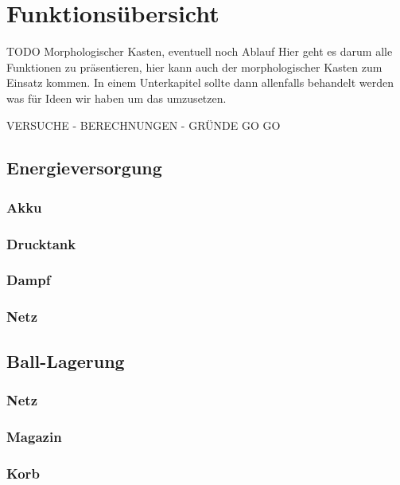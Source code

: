 \section{Funktionsübersicht}
TODO Morphologischer Kasten, eventuell noch Ablauf Hier geht es darum alle Funktionen zu präsentieren, hier kann auch der morphologischer Kasten zum Einsatz kommen.
In einem Unterkapitel sollte dann allenfalls behandelt werden was für Ideen wir haben um das umzusetzen.

VERSUCHE - BERECHNUNGEN - GRÜNDE GO GO

\subsection{Energieversorgung}

\subsubsection{Akku}

\subsubsection{Drucktank}

\subsubsection{Dampf}

\subsubsection{Netz}

\subsection{Ball-Lagerung}

\subsubsection{Netz}

\subsubsection{Magazin}

\subsubsection{Korb}

